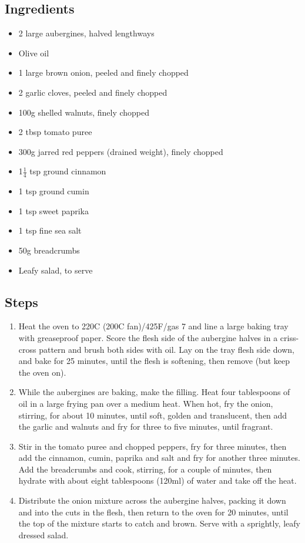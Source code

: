 \documentclass{book}
\begin{document}
\subsection*{Ingredients}
\begin{itemize}
\item 2 large aubergines, halved lengthways
\item Olive oil
\item 1 large brown onion, peeled and finely chopped
\item 2 garlic cloves, peeled and finely chopped
\item 100g shelled walnuts, finely chopped
\item 2 tbsp tomato puree
\item 300g jarred red peppers (drained weight), finely chopped
\item 1$\frac{1}{4}$ tsp ground cinnamon
\item 1 tsp ground cumin
\item 1 tsp sweet paprika
\item 1 tsp fine sea salt
\item 50g breadcrumbs
\item Leafy salad, to serve
\end{itemize}

\subsection*{Steps}
\begin{enumerate}
\item Heat the oven to 220C (200C fan)/425F/gas 7 and line a large baking tray with greaseproof paper. Score the flesh side of the aubergine halves in a criss-cross pattern and brush both sides with oil. Lay on the tray flesh side down, and bake for 25 minutes, until the flesh is softening, then remove (but keep the oven on).
\item While the aubergines are baking, make the filling. Heat four tablespoons of oil in a large frying pan over a medium heat. When hot, fry the onion, stirring, for about 10 minutes, until soft, golden and translucent, then add the garlic and walnuts and fry for three to five minutes, until fragrant.
\item Stir in the tomato puree and chopped peppers, fry for three minutes, then add the cinnamon, cumin, paprika and salt and fry for another three minutes. Add the breadcrumbs and cook, stirring, for a couple of minutes, then hydrate with about eight tablespoons (120ml) of water and take off the heat.
\item Distribute the onion mixture across the aubergine halves, packing it down and into the cuts in the flesh, then return to the oven for 20 minutes, until the top of the mixture starts to catch and brown. Serve with a sprightly, leafy dressed salad.
\end{enumerate}
\newpage
\end{document}
